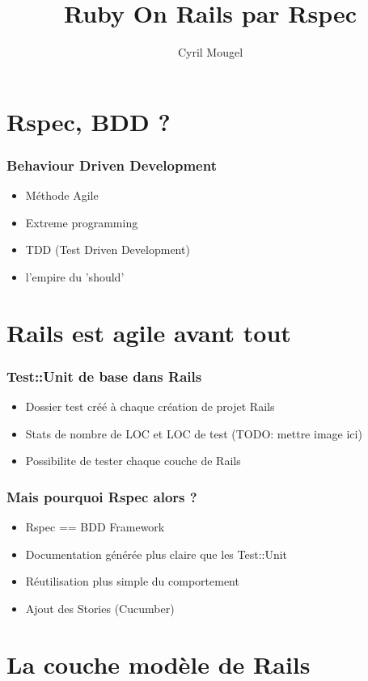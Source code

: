 \documentclass{beamer}
\title{Ruby On Rails par Rspec}
\author{Cyril Mougel}
\begin{document}
\begin{frame}
    \titlepage
\end{frame}

\section{Rspec, BDD ?}

\begin{frame}
	\frametitle{Behaviour Driven Development}
	\begin{itemize}
		\item M\'ethode Agile
		\item Extreme programming
		\item TDD (Test Driven Development)
        \item l'empire du 'should'
	\end{itemize}
\end{frame}

\section{Rails est agile avant tout}

\begin{frame}
    \frametitle{Test::Unit de base dans Rails}
    \begin{itemize}
        \item Dossier test cr\'e\'e \`a chaque cr\'eation de projet Rails
        \item Stats de nombre de LOC et LOC de test (TODO: mettre image ici)
        \item Possibilite de tester chaque couche de Rails
    \end{itemize}
\end{frame}

\begin{frame}
    \frametitle{Mais pourquoi Rspec alors ?}
    \begin{itemize}
        \item Rspec == BDD Framework
        \item Documentation g\'en\'er\'ee plus claire que les Test::Unit
        \item R\'eutilisation plus simple du comportement
        \item Ajout des Stories (Cucumber)
    \end{itemize}
\end{frame}

\section{La couche mod\`ele de Rails}
\end{document}
